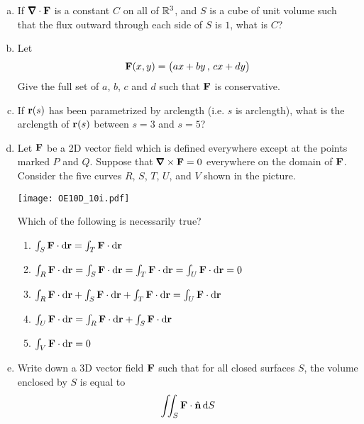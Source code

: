 \begin{question}[M317 2010D]
\begin{enumerate}[(a)]
\item 
If $\vnabla\cdot\vF$ is a constant $C$ on all of $\mathbb{R}^3$, and 
$S$ is a cube of unit volume such that the flux outward through each 
side of $S$ is $1$, what is $C$?

\item
Let
\begin{equation*}
\mathbf{F}(x, y) = \big(ax + by\,,\, cx + dy\big)
\end{equation*}
Give the full set of $a$, $b$, $c$ and $d$ such that $\mathbf{F}$ is conservative.

\item 
If $\mathbf{r}(s)$ has been parametrized by arclength (i.e. $s$ is arclength), 
what is the arclength of $\mathbf{r}(s)$ between $s = 3$ and $s = 5$?

\item 
Let $\mathbf{F}$ be a 2D vector field which is defined everywhere except at 
the points marked $P$ and $Q$. Suppose that $\vnabla\times\vF = 0$ 
everywhere on the domain of $\mathbf{F}$. Consider
the five curves $R$, $S$, $T$, $U$, and $V$ shown in the picture. 

  \begin{center}
       \texttt{[image: OE10D\_10i.pdf]}
  \end{center}

Which of the following is necessarily true?
\begin{enumerate}[(1)]
\item $\int_S \mathbf{F}\cdot\mathrm{d}\mathbf{r} = \int_T \mathbf{F}\cdot\mathrm{d}\mathbf{r}$

\item $\int_R \mathbf{F}\cdot\mathrm{d}\mathbf{r} = \int_S \mathbf{F}\cdot\mathrm{d}\mathbf{r} 
 = \int_T \mathbf{F}\cdot\mathrm{d}\mathbf{r} = \int_U \mathbf{F}\cdot\mathrm{d}\mathbf{r} = 0$

\item $\int_R \mathbf{F}\cdot\mathrm{d}\mathbf{r} + \int_S \mathbf{F}\cdot\mathrm{d}\mathbf{r} 
       + \int_T \mathbf{F}\cdot\mathrm{d}\mathbf{r} = \int_U \mathbf{F}\cdot\mathrm{d}\mathbf{r}$

\item $\int_U \mathbf{F}\cdot\mathrm{d}\mathbf{r} = \int_R \mathbf{F}\cdot\mathrm{d}\mathbf{r} 
   + \int_S \mathbf{F}\cdot\mathrm{d}\mathbf{r}$

\item $\int_V \mathbf{F}\cdot\mathrm{d}\mathbf{r} = 0$
\end{enumerate}

\item 
Write down a 3D vector field $\mathbf{F}$ such that for all closed surfaces $S$, 
the volume enclosed by $S$ is equal to
\begin{equation*}
\iint_S \mathbf{F} \cdot \hat{\mathbf{n}}\,\mathrm{d}S
\end{equation*}


\end{enumerate}
\end{question}
